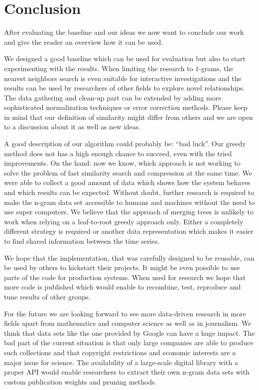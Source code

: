 \chapter{Conclusion}
\label{ch:Conclusion}

After evaluating the baseline and our ideas we now want to conclude our work and give the reader an overview how it can be used.

We designed a good baseline which can be used for evaluation but also to start experimenting with the results. When limiting the research to $1$-grams, the nearest neighbors search is even suitable for interactive investigations and the results can be used by researchers of other fields to explore novel relationships. The data gathering and clean-up part can be extended by adding more sophisticated normalization techniques or error correction methods. Please keep in mind that our definition of similarity might differ from others and we are open to a discussion about it as well as new ideas.

A good description of our algorithm could probably be: \enquote{bad luck}. Our greedy method does not has a high enough chance to succeed, even with the tried improvements. On the hand: now we know, which approach is not working to solve the problem of fast similarity search and compression at the same time. We were able to collect a good amount of data which shows how the system behaves and which results can be expected. Without doubt, further research is required to make the n-gram data set accessible to humans and machines without the need to use super computers. We believe that the approach of merging trees is unlikely to work when relying on a leaf-to-root greedy approach only. Either a completely different strategy is required or another data representation which makes it easier to find shared information between the time series.

We hope that the implementation, that was carefully designed to be reusable, can be used by others to kickstart their projects. It might be even possible to use parts of the code for production systems. When used for research we hope that more code is published which would enable to recombine, test, reproduce and tune results of other groups.

For the future we are looking forward to see more data-driven research in more fields apart from mathematics and computer science as well as in journalism. We think that data sets like the one provided by Google can have a huge impact. The bad part of the current situation is that only large companies are able to produce such collections and that copyright restrictions and economic interests are a major issue for science. The availability of a large-scale digital library with a proper API would enable researchers to extract their own n-gram data sets with custom publication weights and pruning methods.

